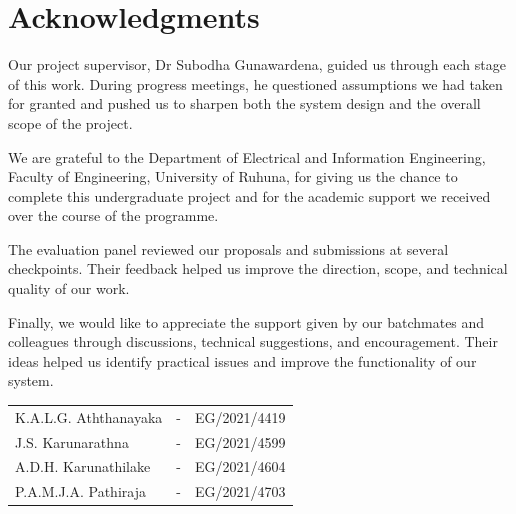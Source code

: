 
\chapter*{Acknowledgments}
Our project supervisor, Dr Subodha Gunawardena, guided us through each stage of this work. During progress meetings, he questioned assumptions we had taken for granted and pushed us to sharpen both the system design and the overall scope of the project.

We are grateful to the Department of Electrical and Information Engineering, Faculty of Engineering, University of Ruhuna, for giving us the chance to complete this undergraduate project and for the academic support we received over the course of the programme.

The evaluation panel reviewed our proposals and submissions at several checkpoints. Their feedback helped us improve the direction, scope, and technical quality of our work.

Finally, we would like to appreciate the support given by our batchmates and colleagues through discussions, technical suggestions, and encouragement. Their ideas helped us identify practical issues and improve the functionality of our system.

\vspace{3cm}


\begin{flushright}
  \begin{tabular}{lll}
      K.A.L.G. Aththanayaka 	& - & 	EG/2021/4419\\
       J.S. Karunarathna	& - & 	EG/2021/4599\\
        A.D.H. Karunathilake	& - & 	EG/2021/4604\\
         P.A.M.J.A. Pathiraja  	& - &	EG/2021/4703
  \end{tabular}
\end{flushright}
\vspace{0.8cm}




